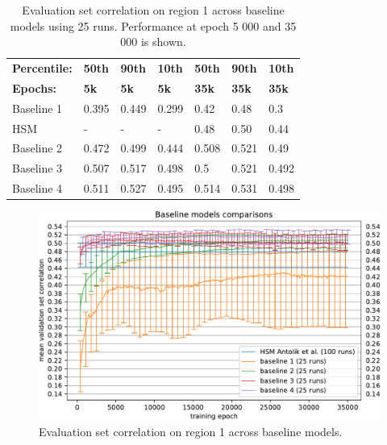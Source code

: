 \setlength{\abovecaptionskip}{10pt plus 0pt minus 0pt} %
\begin{table}[H]
    \renewcommand{\arraystretch}{1.0}
    \centering
    \begin{tabular}{l|l|l|l|l|l|l}
        \toprule
        \textbf{Percentile:} & \textbf{50th} & \textbf{90th} & \textbf{10th} & \textbf{50th} & \textbf{90th} & \textbf{10th} \\
        \textbf{Epochs:} & \textbf{5k} & \textbf{5k} & \textbf{5k} & \textbf{35k} & \textbf{35k}& \textbf{35k} \\ \midrule
        Baseline 1 & 0.395 & 0.449 & 0.299 & 0.42 & 0.48 & 0.3 \\ 
        HSM \citeauthor{antolik} & - & - & - & 0.48 & 0.50 & 0.44 \\ 
        Baseline 2 & 0.472 & 0.499 & 0.444 & 0.508 & 0.521 & 0.49 \\ 
        Baseline 3 & 0.507 & 0.517 & 0.498 & 0.5 & 0.521 & 0.492 \\ 
        Baseline 4 & 0.511 & 0.527 & 0.495 & 0.514 & 0.531 & 0.498 \\ \bottomrule
    \end{tabular}
    \caption[Evaluation of 5k/35k epochs training on region 1]{Evaluation set correlation on region 1 across baseline models using 25 runs. Performance at epoch 5 000 and 35 000 is shown\protect\footnotemark. }
    \label{tab:5.1.5}
    \renewcommand{\arraystretch}{1.0}
\end{table}
\setlength{\abovecaptionskip}{0pt plus 0pt minus 0pt} %

\begin{figure}[H]
    \centering
    \includegraphics[width=1\textwidth]{../figures/05_1_5_1}
    \caption[Baseline models on region 1]{Evaluation set correlation on region 1 across baseline models.}
    \label{fig:5.1.5}
\end{figure}

